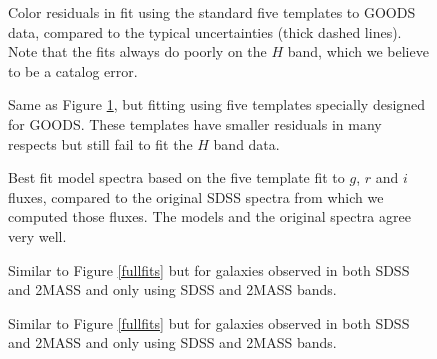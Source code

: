 \clearpage
{}
\begin{figure}
\figurenum{\fignum}
\caption{\label{goods} Color residuals in fit using the standard five
templates to GOODS data, compared to the typical uncertainties (thick
dashed lines). Note that the fits always do poorly on the $H$ band,
which we believe to be a catalog error. }
\end{figure}

\clearpage
{}
\begin{figure}
\figurenum{\fignum}
\caption{\label{goods_special} Same as Figure \ref{goods}, but fitting
using five templates specially designed for GOODS. These templates
have smaller residuals in many respects but still fail to fit the $H$
band data. }
\end{figure}

\clearpage
{}
\begin{figure}
\figurenum{\fignum}
\caption{\label{specfit} Best fit model spectra based on the five
template fit to $g$, $r$ and $i$ fluxes, compared to the original
SDSS spectra from which we computed those fluxes.  The models and the
original spectra agree very well.}
\end{figure}

\clearpage
{}
\begin{figure}
\figurenum{\fignum}
\caption{\label{twomass_resid} Similar to Figure \ref{fullfits} but
for galaxies observed in both SDSS and 2MASS and only using SDSS and
2MASS bands. }
\end{figure}

\clearpage
{}
\begin{figure}
\figurenum{\fignum}
\caption{\label{twomass_resid} Similar to Figure \ref{fullfits} but
for galaxies observed in both SDSS and 2MASS and only using SDSS and
2MASS bands. }
\end{figure}
